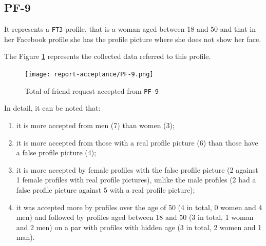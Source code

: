 \subsection*{PF-9}
It represents a \texttt{FT3} profile, that is a woman aged between 18 and 50 and that in her Facebook profile she has the profile picture where she does not show her face.
\par \noindent The Figure \ref{fig:accepted-from-PF9} represents the collected data referred to this profile.
\begin{figure}[H]	
	\centering
	\texttt{[image: report-acceptance/PF-9.png]} 
	\caption{Total of friend request accepted from \texttt{PF-9}}
	\label{fig:accepted-from-PF9}
\end{figure}
\par \noindent In detail, it can be noted that:
\begin{enumerate}		
	\item it is more accepted from men (7) than women (3);
	\item it is more accepted from those with a real profile picture (6) than those have a false profile picture (4);
	\item it is more accepted by female profiles with the false profile picture (2 against 1 female profiles with real profile pictures), unlike the male profiles (2 had a false profile picture against 5 with a real profile picture);
	\item it was accepted more by profiles over the age of 50 (4 in total, 0 women and 4 men) and followed by profiles aged between 18 and 50 (3 in total, 1 woman and 2 men) on a par with profiles with hidden age (3 in total, 2 women and 1 man).
\end{enumerate}


